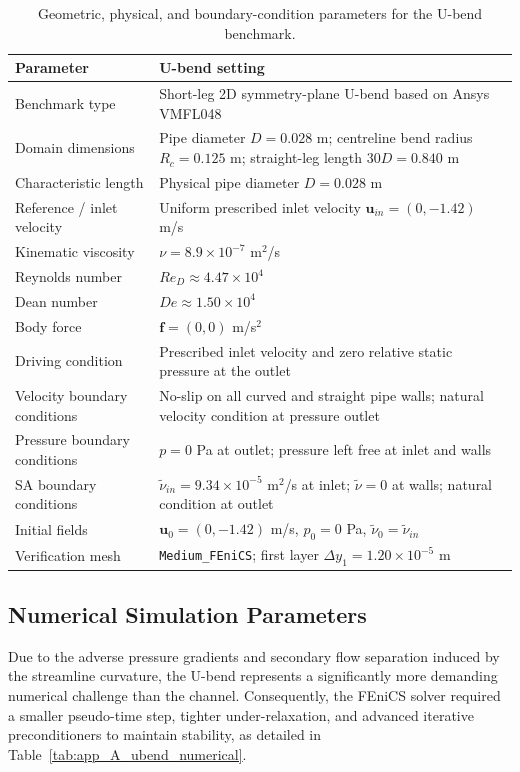 \begin{table}[htbp]
	\centering
	\footnotesize
	\caption{Geometric, physical, and boundary-condition parameters for the U-bend benchmark.}
	\label{tab:app_A_ubend_physical}
	\renewcommand{\arraystretch}{1.2}
	\begin{tabularx}{\textwidth}{l X}
		\hline
		\textbf{Parameter} & \textbf{U-bend setting} \\
		\hline
		Benchmark type & Short-leg 2D symmetry-plane U-bend based on Ansys VMFL048 \\
		Domain dimensions & Pipe diameter $D=0.028$ m; centreline bend radius $R_c=0.125$ m; straight-leg length $30D=0.840$ m \\
		Characteristic length & Physical pipe diameter $D=0.028$ m \\
		Reference / inlet velocity & Uniform prescribed inlet velocity $\mathbf{u}_{in}=(0,-1.42)$ m/s \\
		Kinematic viscosity & $\nu = 8.9 \times 10^{-7}$ m$^2$/s \\
		Reynolds number & $Re_D \approx 4.47 \times 10^4$ \\
		Dean number & $De \approx 1.50 \times 10^4$ \\
		Body force & $\mathbf{f}=(0,0)$ m/s$^2$ \\
		Driving condition & Prescribed inlet velocity and zero relative static pressure at the outlet \\
		Velocity boundary conditions & No-slip on all curved and straight pipe walls; natural velocity condition at pressure outlet \\
		Pressure boundary conditions & $p=0$ Pa at outlet; pressure left free at inlet and walls \\
		SA boundary conditions & $\tilde{\nu}_{in}=9.34 \times 10^{-5}$ m$^2$/s at inlet; $\tilde{\nu}=0$ at walls; natural condition at outlet \\
			Initial fields & $\mathbf{u}_0=(0,-1.42)$ m/s, $p_0=0$ Pa, $\tilde{\nu}_0=\tilde{\nu}_{in}$ \\
		Verification mesh & \texttt{Medium\_FEniCS}; first layer $\Delta y_1 = 1.20 \times 10^{-5}$ m \\
		\hline
	\end{tabularx}
\end{table}

\subsection{Numerical Simulation Parameters}
\label{subsec:app_A_ubend_numerical}
Due to the adverse pressure gradients and secondary flow separation induced by the streamline curvature, the U-bend represents a significantly more demanding numerical challenge than the channel. Consequently, the FEniCS solver required a smaller pseudo-time step, tighter under-relaxation, and advanced iterative preconditioners to maintain stability, as detailed in Table~\ref{tab:app_A_ubend_numerical}.

